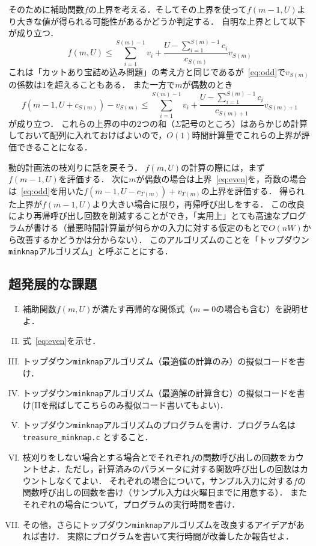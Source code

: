 \documentclass[a4paper,twoside,onecolumn,openany,article]{memoir}
\theoremstyle{remark}
\begin{document}
そのために補助関数$f$の上界を考える．そしてその上界を使って$f(m-1,U)$より大きな値が得られる可能性があるかどうか判定する．
自明な上界として以下が成り立つ．
\begin{equation}
f(m, U) \le \sum_{i=1}^{S(m)-1} v_i + \frac{U-\sum_{i=1}^{S(m)-1} c_i}{c_{S(m)}} v_{S(m)}
\label{eq:odd}
\end{equation}
これは「カットあり宝詰め込み問題」の考え方と同じであるが~\eqref{eq:odd}で$v_{S(m)}$の係数は1を超えることもある．
また一方で$m$が偶数のとき
\begin{equation}
f(m-1,U+c_{S(m)})-v_{S(m)}
\le \sum_{i=1}^{S(m)-1} v_i + \frac{U-\sum_{i=1}^{S(m)-1} c_i}{c_{S(m)+1}} v_{S(m)+1}
\label{eq:even}
\end{equation}
が成り立つ．
これらの上界の中の2つの和（$\Sigma$記号のところ）はあらかじめ計算しておいて配列に入れておけばよいので，$O(1)$時間計算量でこれらの上界が評価できることになる．

動的計画法の枝刈りに話を戻そう．
$f(m,U)$の計算の際には，まず$f(m-1,U)$を評価する．
次に$m$が偶数の場合は上界~\eqref{eq:even}を，奇数の場合は~\eqref{eq:odd}を用いた$f(m-1,U-c_{T(m)})+v_{T(m)}$の上界を評価する．
得られた上界が$f(m-1,U)$より大きい場合に限り，再帰呼び出しをする．
この改良により再帰呼び出し回数を削減することができ，「実用上」とても高速なプログラムが書ける（最悪時間計算量が何らかの入力に対する仮定のもとで$O(nW)$から改善するかどうかは分からない）．
このアルゴリズムのことを「トップダウン\texttt{minknap}アルゴリズム」と呼ぶことにする．


\subsection{超発展的な課題}
\begin{enumerate}[I.]
\item 補助関数$f(m,U)$が満たす再帰的な関係式（$m=0$の場合も含む）を説明せよ．
\item 式~\eqref{eq:even}を示せ．
\item トップダウン\texttt{minknap}アルゴリズム（最適値の計算のみ）の擬似コードを書け．
\item トップダウン\texttt{minknap}アルゴリズム（最適解の計算含む）の擬似コードを書け(IIを飛ばしてこちらのみ擬似コード書いてもよい)．
\item トップダウン\texttt{minknap}アルゴリズムのプログラムを書け．プログラム名は \texttt{treasure\_minknap.c} とすること． 
\item 枝刈りをしない場合とする場合とでそれぞれ$f$の関数呼び出しの回数をカウントせよ．ただし，計算済みのパラメータに対する関数呼び出しの回数はカウントしなくてよい．
それぞれの場合について，サンプル入力に対する$f$の関数呼び出しの回数を書け（サンプル入力は火曜日までに用意する）．
またそれぞれの場合について，プログラムの実行時間を書け．
\item その他，さらにトップダウン\texttt{minknap}アルゴリズムを改良するアイデアがあれば書け．
実際にプログラムを書いて実行時間が改善したか報告せよ．
\end{enumerate}
\end{document}
